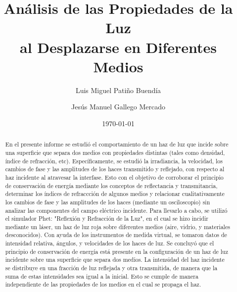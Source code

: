 \documentclass[
aps,
reprint,
amsmath, amssymb,
superscriptaddress,
]{revtex4-2}
\begin{document}

\title{Análisis de las Propiedades de la Luz \\al Desplazarse en Diferentes Medios}

\author{Luis Miguel Patiño Buendía}
\author{Jesús Manuel Gallego Mercado}




\date{\today}

\begin{abstract}
En el presente informe se estudió el comportamiento de un haz de luz que incide sobre una superficie que separa dos medios con propiedades distintas (tales como densidad, índice de refracción, etc). Específicamente, se estudió la irradiancia, la velocidad, los cambios de fase y las amplitudes de los haces transmitido y reflejado, con respecto al haz incidente al atravesar la interfase. Esto con el objetivo de corroborar el principio de conservación de energía mediante los conceptos de reflectancia y transmitancia,  determinar los índices de refraccción de algunos medios y relacionar cualitativamente los cambios de fase y las amplitudes de los haces (mediante un osciloscopio) sin analizar las componentes del campo eléctrico incidente. Para llevarlo a cabo, se utilizó el simulador Phet: "Reflexión y Refracción de la Luz", en el cual se hizo incidir mediante un láser, un haz de luz roja sobre diferentes medios (aire, vidrio, y materiales desconocidos). Con ayuda de los instrumentos de medida virtual, se tomaron datos de intensidad relativa, ángulos, y velocidades de los haces de luz. Se concluyó que el principio de conservación de energía está presente en la configuración de un haz de luz incidente sobre una superficie que separa dos medios. La intensidad del haz incidente se distribuye en una fracción de luz reflejada y otra transmitida, de manera que la suma de estas intensidades sea igual a la inicial. Esto se cumple de manera independiente de las propiedades de los medios en el cual se propaga el haz.
\end{abstract}


\maketitle
\end{document}
